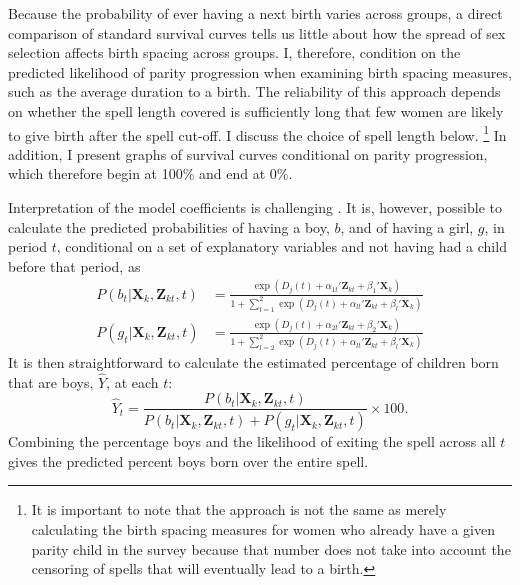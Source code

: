\documentclass[12pt,letterpaper]{article}
\begin{document}
Because the probability of ever having a next birth varies across groups, a direct 
comparison of standard survival curves tells us little about how the spread of sex 
selection affects birth spacing across groups.
I, therefore, condition on the predicted likelihood of parity progression when examining 
birth spacing measures, such as the average duration to a birth.
The reliability of this approach depends on whether the spell length covered is 
sufficiently long that few women are likely to give birth after the spell cut-off.
I discuss the choice of spell length below.%
\footnote{
It is important to note that the approach is not the same as merely calculating 
the birth spacing measures for women who already have a given 
parity child in the survey because that number does not take into account
the censoring of spells that will eventually lead to a birth.
}
In addition, I present graphs of survival curves conditional on parity progression,
which therefore begin at 100\% and end at 0\%.

Interpretation of the model coefficients is challenging \citep{thomas96}.
It is, however, possible to calculate the predicted probabilities of 
having a boy, $b$, and of having a girl, $g$, in period $t$, conditional on 
a set of explanatory variables and not having had a child before that period, as
\begin{align}
P(b_{t} | \mathbf{X}_{k}, \mathbf{Z}_{kt}, t ) 
& =  
\frac{ \exp(D_j(t) + \alpha_{1t}' \mathbf{Z}_{kt} + \beta_1' \mathbf{X}_{k} )}
{1 + \sum_{l=1}^2 \exp(D_j(t) + \alpha_{lt} ' \mathbf{Z}_{kt} + \beta_l ' \mathbf{X}_{k})}
\label{eq:probability_boy} \\
P(g_{t} | \mathbf{X}_{k}, \mathbf{Z}_{kt},t ) 
& =  
\frac{ \exp(D_j(t) + \alpha_{2t}'\mathbf{Z}_{kt} + \beta_2'\mathbf{X}_{k} )}
{1 + \sum_{l=2}^2 \exp(D_j(t) + \alpha_{lt}'\mathbf{Z}_{kt} + \beta_l'\mathbf{X}_{k})}
\label{eq:probability_girl}
\end{align}
It is then straightforward to calculate the estimated percentage of children born that 
are boys, $\hat{Y}$, at each $t$:  
\begin{equation}
\hat{Y}_t 
= 
\frac{ P(b_{t} | \mathbf{X}_{k}, \mathbf{Z}_{kt},t )}
{ P(b_{t} | \mathbf{X}_{k}, \mathbf{Z}_{kt},t) + P(g_{t} | \mathbf{X}_{k}, \mathbf{Z}_{kt},t )} 
\times 100.
\label{eq:probability_son}
\end{equation}
Combining the percentage boys and the likelihood of exiting the spell 
across all $t$ gives the predicted percent boys born over the entire spell.
\end{document}
